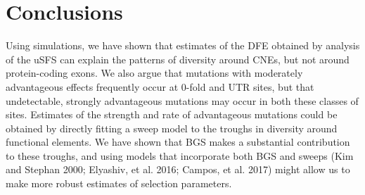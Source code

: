 \section{Conclusions}


	Using simulations, we have shown that estimates of the DFE obtained by analysis of the uSFS can explain the patterns of diversity around CNEs, but not around protein-coding exons. We also argue that mutations with moderately advantageous effects frequently occur at 0-fold and UTR sites, but that undetectable, strongly advantageous mutations may occur in both these classes of sites. Estimates of the strength and rate of advantageous mutations could be obtained by directly fitting a sweep model to the troughs in diversity around functional elements. We have shown that BGS makes a substantial contribution to these troughs, and using models that incorporate both BGS and sweeps (Kim and Stephan 2000; Elyashiv, et al. 2016; Campos, et al. 2017)  might allow us to make more robust estimates of selection parameters. 




